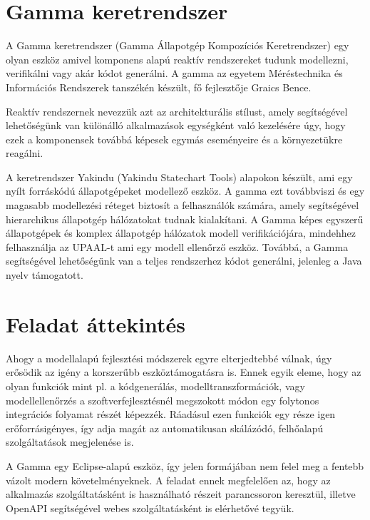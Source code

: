 \section{Gamma keretrendszer}
A Gamma keretrendszer (Gamma Állapotgép Kompozíciós Keretrendszer) egy olyan eszköz amivel komponens alapú reaktív rendszereket tudunk modellezni, verifikálni vagy akár kódot generálni. A gamma az egyetem Méréstechnika és Információs Rendszerek tanszékén készült, fő fejlesztője Graics Bence.

Reaktív rendszernek nevezzük azt az architekturális stílust, amely segítségével lehetőségünk van különálló alkalmazások egységként való kezelésére úgy, hogy ezek a komponensek továbbá képesek egymás eseményeire és a környezetükre reagálni.

A keretrendszer Yakindu (Yakindu Statechart Tools) alapokon készült, ami egy nyílt forráskódú állapotgépeket modellező eszköz. A gamma ezt továbbviszi és egy magasabb modellezési réteget biztosít a felhasználók számára, amely segítségével hierarchikus állapotgép hálózatokat tudnak kialakítani. A Gamma képes egyszerű állapotgépek és komplex állapotgép hálózatok modell verifikációjára, mindehhez felhasználja az UPAAL-t ami egy modell ellenőrző eszköz. Továbbá, a Gamma segítségével lehetőségünk van a teljes rendszerhez kódot generálni, jelenleg a Java nyelv támogatott.

\section{Feladat áttekintés}
Ahogy a modellalapú fejlesztési módszerek egyre elterjedtebbé válnak, úgy erősödik az igény a korszerűbb eszköztámogatásra is. Ennek egyik eleme, hogy az olyan funkciók mint pl. a kódgenerálás, modelltranszformációk, vagy modellellenőrzés a szoftverfejlesztésnél megszokott módon egy folytonos integrációs folyamat részét képezzék. Ráadásul ezen funkciók egy része igen erőforrásigényes, így adja magát az automatikusan skálázódó, felhőalapú szolgáltatások megjelenése is.


A Gamma egy Eclipse-alapú eszköz, így jelen formájában nem felel meg a fentebb vázolt modern követelményeknek. A feladat ennek megfelelően az, hogy az alkalmazás szolgáltatásként is használható részeit parancssoron keresztül, illetve OpenAPI segítségével webes szolgáltatásként is elérhetővé tegyük.

